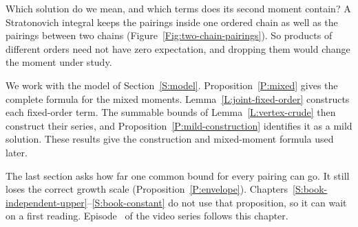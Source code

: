 Which solution do we mean, and which terms does its second moment contain? A
Stratonovich integral keeps the pairings inside one ordered chain as well as
the pairings between two chains (Figure~\ref{Fig:two-chain-pairings}). So
products of different orders need not have zero expectation, and dropping
them would change the moment under study.

We work with the model of Section~\ref{S:model}. Proposition~\ref{P:mixed}
gives the complete formula for the mixed
moments. Lemma~\ref{L:joint-fixed-order} constructs each fixed-order term. The
summable bounds of Lemma~\ref{L:vertex-crude} then construct their series, and
Proposition~\ref{P:mild-construction} identifies it as a mild solution. These
results give the construction and mixed-moment formula used later.

The last section asks how far one common bound for every pairing can go. It
still loses the correct growth scale (Proposition~\ref{P:envelope}).
Chapters~\ref{S:book-independent-upper}--\ref{S:book-constant}
do not use that proposition, so it can wait on a first
reading. Episode~ of the video series follows
this chapter.

